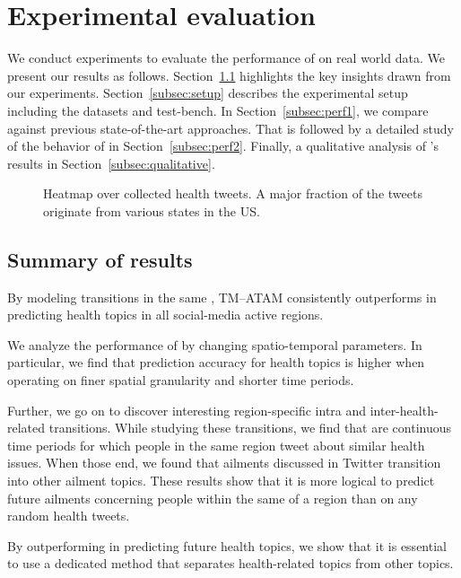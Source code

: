 \section{Experimental evaluation}
\label{sec:results}
We conduct experiments to evaluate the performance of \tmatam on 
real world data. We present our results as follows. 
Section~\ref{subsec:summary} highlights the key insights drawn 
from our experiments. Section~\ref{subsec:setup} describes the 
experimental setup including the datasets and test-bench. In 
Section~\ref{subsec:perf1}, we compare \tmatam against previous 
state-of-the-art approaches. That is followed by a detailed study of
the behavior of \tmatam in Section~\ref{subsec:perf2}. Finally, 
a qualitative analysis of \tmatam's results in Section~\ref{subsec:qualitative}.

\begin{figure}[t!]
\centering
{}
\caption{Heatmap over collected health tweets. A major fraction
of the tweets originate from various states in the US.}
\label{fig:data:heatmap}
\end{figure}

\subsection{Summary of results}
\label{subsec:summary}
By modeling transitions in the same \change, TM–ATAM
consistently outperforms \tmlda in predicting 
health topics in all social-media active regions.

We analyze the performance of \tmatam by changing spatio-temporal parameters.
In particular, we find that prediction accuracy for health topics is higher when operating \tmatam on finer spatial granularity and shorter time periods.

Further, we go on to discover interesting region-specific intra and inter-\change health-related transitions. 
While studying these transitions, we find that \changes are continuous time periods for which people in the same region tweet about similar health issues. When those \changes end, we found that ailments discussed in Twitter transition into other ailment topics.
These results show that it is more logical to predict future ailments concerning people within the same \change of a
region than on any random health tweets.

By outperforming \tmlda in predicting future health topics, we show that it is essential 
to use a dedicated method that separates health-related topics from other topics. 

